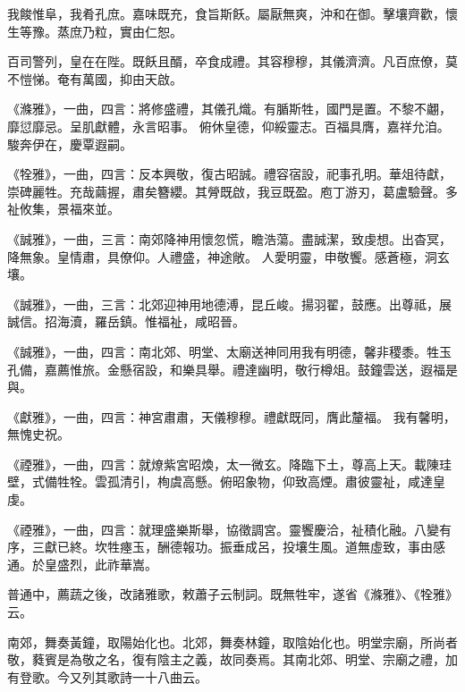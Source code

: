\begin{pinyinscope}
 我餕惟阜，我肴孔庶。嘉味既充，食旨斯飫。屬厭無爽，沖和在御。擊壤齊歡，懷生等豫。蒸庶乃粒，實由仁恕。



 百司警列，皇在在陛。既飫且醑，卒食成禮。其容穆穆，其儀濟濟。凡百庶僚，莫不愷悌。奄有萬國，抑由天啟。



 《滌雅》，一曲，四言：將修盛禮，其儀孔熾。有腯斯牲，國門是置。不黎不翽，靡愆靡忌。呈肌獻體，永言昭事。
 俯休皇德，仰綏靈志。百福具膺，嘉祥允洎。駿奔伊在，慶覃遐嗣。



 《牷雅》，一曲，四言：反本興敬，復古昭誠。禮容宿設，祀事孔明。華俎待獻，崇碑麗牲。充哉繭握，肅矣簪纓。其膋既啟，我豆既盈。庖丁游刃，葛盧驗聲。多祉攸集，景福來並。



 《誠雅》，一曲，三言：南郊降神用懷忽慌，瞻浩蕩。盡誠潔，致虔想。出杳冥，降無象。皇情肅，具僚仰。人禮盛，神途敞。
 人愛明靈，申敬饗。感蒼極，洞玄壤。



 《誠雅》，一曲，三言：北郊迎神用地德溥，昆丘峻。揚羽翟，鼓應。出尊祗，展誠信。招海瀆，羅岳鎮。惟福祉，咸昭晉。



 《誠雅》，一曲，四言：南北郊、明堂、太廟送神同用我有明德，馨非稷黍。牲玉孔備，嘉薦惟旅。金懸宿設，和樂具舉。禮達幽明，敬行樽俎。鼓鐘雲送，遐福是與。



 《獻雅》，一曲，四言：神宮肅肅，天儀穆穆。禮獻既同，膺此釐福。
 我有馨明，無愧史祝。



 《禋雅》，一曲，四言：就燎紫宮昭煥，太一微玄。降臨下土，尊高上天。載陳珪壁，式備牲牷。雲孤清引，栒虞高懸。俯昭象物，仰致高煙。肅彼靈祉，咸達皇虔。



 《禋雅》，一曲，四言：就理盛樂斯舉，協徵調宮。靈饗慶洽，祉積化融。八變有序，三獻已終。坎牲瘞玉，酬德報功。振垂成呂，投壤生風。道無虛致，事由感通。於皇盛烈，此祚華嵩。



 普通中，薦蔬之後，改諸雅歌，敕蕭子云制詞。既無牲牢，遂省《滌雅》、《牷雅》云。



 南郊，舞奏黃鐘，取陽始化也。北郊，舞奏林鐘，取陰始化也。明堂宗廟，所尚者敬，蕤賓是為敬之名，復有陰主之義，故同奏焉。其南北郊、明堂、宗廟之禮，加有登歌。今又列其歌詩一十八曲云。




\end{pinyinscope}
